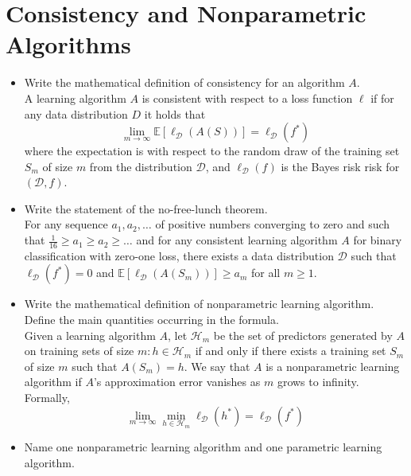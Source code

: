 \newpage
\section{Consistency and Nonparametric Algorithms}

\begin{itemize}

    \item Write the mathematical definition of consistency for an algorithm $A$.\\ 
        
        A learning algorithm $A$ is consistent with respect to a loss function $\ell$ if for any data
distribution $D$ it holds that
        $$
        \lim_{m \to \infty} \mathbb{E} \left[ \ell_{\mathcal{D}}(A(S)) \right] = \ell_{\mathcal{D}}(f^*)
        $$
        where the expectation is with respect to the random draw of the training set $S_m$ of size $m$ from the distribution $\mathcal{D}$, and $\ell_{\mathcal{D}}(f)$ is the Bayes risk risk for $(\mathcal{D}, f)$.\\

    \item Write the statement of the no-free-lunch theorem.\\
        
        For any sequence $a_1, a_2, \dots$ of positive numbers converging to zero and such that $\frac{1}{16} \geq a_1 \geq a_2 \geq \dots$ and for any consistent learning algorithm $A$ for binary classification with zero-one loss, there exists a data distribution $\mathcal{D}$ such that $\ell_{\mathcal{D}}(f^*) = 0$ and $\mathbb{E}[\ell_{\mathcal{D}}(A(S_m))] \geq a_m$ for all $m \geq 1$.\\

    \item Write the mathematical definition of nonparametric learning algorithm. Define the main quantities occurring in the formula.\\

        Given a learning algorithm $A$, let $\mathcal{H}_m$ be the set of predictors generated by $A$ on training sets of size $m: h \in \mathcal{H}_m$ if and only if there exists a training set $S_m$ of size $m$ such that $A(S_m) = h$. We say that $A$ is a nonparametric learning algorithm if $A$'s approximation error vanishes as $m$ grows to infinity. Formally,
        $$
        \lim_{m \to \infty} \min_{h \in \mathcal{H}_m} \ell_{\mathcal{D}}(h^*) = \ell_{\mathcal{D}}(f^*) 
        $$

    \item Name one nonparametric learning algorithm and one parametric learning algorithm.\\


\end{itemize}
